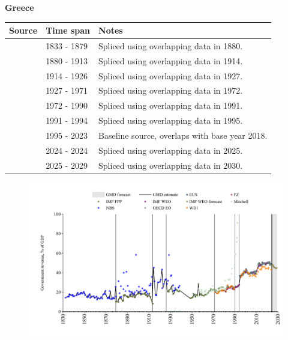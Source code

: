 \documentclass[12pt,a4paper,landscape]{article}
\begin{document}
\begin{adjustbox}{max totalsize={\paperwidth}{\paperheight},center}
\begin{minipage}[t][\textheight][t]{\textwidth}
\vspace*{0.5cm}
{}
\begin{center}
{\Large\bfseries Greece}
\end{center}
\vspace{0.5cm}
\begin{table}[H]
\centering
\small
\begin{tabular}{|l|l|l|}
\hline
\textbf{Source} & \textbf{Time span} & \textbf{Notes} \\
\hline
\rowcolor{white}\cite{NBS}& 1833 - 1879 &Spliced using overlapping data in 1880.\\
\rowcolor{lightgray}\cite{IMF_FPP}& 1880 - 1913 &Spliced using overlapping data in 1914.\\
\rowcolor{white}\cite{NBS}& 1914 - 1926 &Spliced using overlapping data in 1927.\\
\rowcolor{lightgray}\cite{IMF_FPP}& 1927 - 1971 &Spliced using overlapping data in 1972.\\
\rowcolor{white}\cite{WDI}& 1972 - 1990 &Spliced using overlapping data in 1991.\\
\rowcolor{lightgray}\cite{IMF_WEO}& 1991 - 1994 &Spliced using overlapping data in 1995.\\
\rowcolor{white}\cite{OECD_EO}& 1995 - 2023 &Baseline source, overlaps with base year 2018.\\
\rowcolor{lightgray}\cite{EUS}& 2024 - 2024 &Spliced using overlapping data in 2025.\\
\rowcolor{white}\cite{IMF_WEO_forecast}& 2025 - 2029 &Spliced using overlapping data in 2030.\\
\hline
\end{tabular}
\end{table}
\begin{figure}[H]
\centering
\includegraphics[width=\textwidth,height=0.6\textheight,keepaspectratio]{graphs/GRC_govrev_GDP.pdf}
\end{figure}
\end{minipage}
\end{adjustbox}
\end{document}
